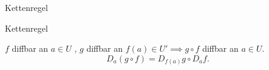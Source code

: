 \documentclass[class=article, crop=false]{standalone}
\begin{document}
\begin{zettel}{Kettenregel}
\begin{flashcard}{Kettenregel}
	\begin{theorem}
		$f$ diffbar an $a \in  U$ , $g$ diffbar an $ f (a) \in  U' \implies g \circ f $ diffbar an $a \in  U$.
		\[
			D_a (g \circ f) = D_{f(a)} g \circ  D_a f
		.\]
	\end{theorem}
\end{flashcard}
\end{zettel}
\end{document}
